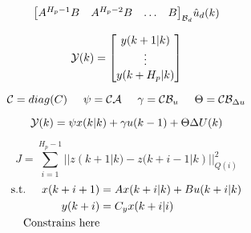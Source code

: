 \begin{equation}
\begin{aligned}
{\begin{bmatrix}
		A^{H_p-1}B&A^{H_p-2}B&\hdots &B 
	  \end{bmatrix}}_{\CMcal{B}_d}
	\hat{u}_d(k)
	\end{aligned}
\end{equation}






\begin{equation}
	\CMcal{Y}(k)= 
	\begin{bmatrix}
	y(k+1|k)\\
	\vdots\\
	y(k+H_p|k)
	\end{bmatrix}
\end{equation}



\begin{equation}
	\CMcal{C} = diag(C) \hspace{5mm} \psi = \CMcal{C}\CMcal{A}  \hspace{5mm} \gamma = \CMcal{C}\CMcal{B}_u \hspace{5mm}  \Theta = \CMcal{C}\CMcal{B}_{\Delta u}
\end{equation}

\begin{equation}
	\CMcal{Y}(k) = \psi x(k|k) + \gamma u(k-1) + \Theta \Delta U(k)
\end{equation}


\begin{equation}
	 J = \sum_{i=1}^{H_p-1} || z(k+1|k)-z(k+i-1|k)||_{Q(i)}^2
\end{equation}
\begin{equation}
	\begin{aligned}
	\text{s.t.} \hspace{5mm}  x(k+i+1) &= Ax(k+i|k)+Bu(k+i|k) \\
						      y(k+i)&= C_yx(k+i|i) \\
						      \text{Constrains here}
	\end{aligned}
\end{equation}



